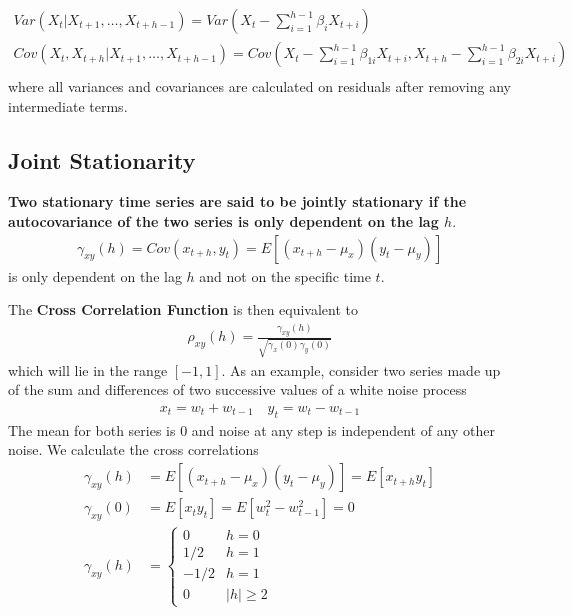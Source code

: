 \documentclass[../../time_series_notes.tex]{subfiles}
\begin{document}
\begin{align*}
    Var(X_{t}|X_{t+1},\ldots,X_{t+h-1}) = Var(X_{t} - \sum_{i=1}^{h-1}\beta_{i}X_{t+i})\\
    Cov(X_{t},X_{t+h}|X_{t+1},\ldots,X_{t+h-1}) = Cov(X_{t} - \sum_{i=1}^{h-1}\beta_{1i}X_{t+i}, X_{t+h} - \sum_{i=1}^{h-1}\beta_{2i}X_{t+i})\\
\end{align*}
where all variances and covariances are calculated on residuals after removing any intermediate terms.

\subsection{Joint Stationarity}
\textbf{Two stationary time series are said to be jointly stationary if the autocovariance of the two series is only dependent on the lag $h$}.\newline
\begin{align*}
    \gamma_{xy}(h) = Cov(x_{t+h}, y_{t}) = E[(x_{t+h} - \mu_{x})(y_{t} - \mu_{y})]
\end{align*}
is only dependent on the lag $h$ and not on the specific time $t$.\newline

The \textbf{Cross Correlation Function} is then equivalent to
\begin{align*}
    \rho_{xy}(h) = \frac{\gamma_{xy}(h)}{\sqrt{\gamma_{x}(0) \gamma_{y}(0)}}
\end{align*}
which will lie in the range $[-1,1]$. As an example, consider two series made up of the sum and differences of two successive values of a white noise process
\begin{align*}
    x_{t} = w_{t} + w_{t-1} \quad y_{t} = w_{t} - w_{t-1}
\end{align*}
The mean for both series is $0$ and noise at any step is independent of any other noise. We calculate the cross correlations
\begin{align*}
    \gamma_{xy}(h) &= E[(x_{t+h} - \mu_{x})(y_{t} - \mu_{y})] = E[x_{t+h}y_{t}]\\
    \gamma_{xy}(0) &= E[x_{t}y_{t}] = E[w_{t}^{2} - w_{t-1}^{2}] = 0\\
    \gamma_{xy}(h) &= \begin{cases} 0 &\mbox{$h = 0$}\\ 1/2 &\mbox{$h=1$}\\ -1/2 &\mbox{$h=1$}\\ 0 &\mbox{$\lvert h \rvert \geq 2$} \end{cases}
\end{align*}
\end{document}
